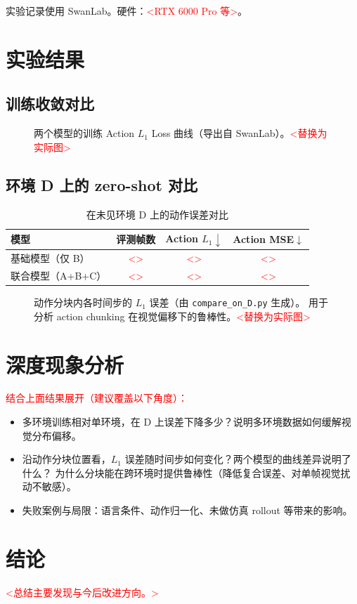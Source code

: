 \documentclass[11pt]{ctexart}
\begin{document}
实验记录使用 SwanLab。硬件：\textcolor{red}{<RTX 6000 Pro 等>}。

\section{实验结果}
\subsection{训练收敛对比}
\begin{figure}[h]\centering
\caption{两个模型的训练 Action $L_1$ Loss 曲线（导出自 SwanLab）。\textcolor{red}{<替换为实际图>}}
\label{fig:loss}
\end{figure}

\subsection{环境 D 上的 zero-shot 对比}
\begin{table}[h]\centering
\caption{在未见环境 D 上的动作误差对比}\label{tab:zeroshot}
\begin{tabular}{lccc}
\toprule
模型 & 评测帧数 & Action $L_1\downarrow$ & Action MSE$\downarrow$ \\
\midrule
基础模型（仅 B） & \textcolor{red}{<>} & \textcolor{red}{<>} & \textcolor{red}{<>} \\
联合模型（A+B+C） & \textcolor{red}{<>} & \textcolor{red}{<>} & \textcolor{red}{<>} \\
\bottomrule
\end{tabular}
\end{table}

\begin{figure}[h]\centering
\caption{动作分块内各时间步的 $L_1$ 误差（由 \texttt{compare\_on\_D.py} 生成）。
用于分析 action chunking 在视觉偏移下的鲁棒性。\textcolor{red}{<替换为实际图>}}
\label{fig:chunk}
\end{figure}

\section{深度现象分析}
\textcolor{red}{结合上面结果展开（建议覆盖以下角度）：}
\begin{itemize}
  \item 多环境训练相对单环境，在 D 上误差下降多少？说明多环境数据如何缓解视觉分布偏移。
  \item 沿动作分块位置看，$L_1$ 误差随时间步如何变化？两个模型的曲线差异说明了什么？
        为什么分块能在跨环境时提供鲁棒性（降低复合误差、对单帧视觉扰动不敏感）。
  \item 失败案例与局限：语言条件、动作归一化、未做仿真 rollout 等带来的影响。
\end{itemize}

\section{结论}
\textcolor{red}{<总结主要发现与今后改进方向。>}



\end{document}
